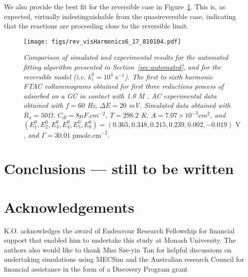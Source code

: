 \documentclass[a4paper, 12pt]{article}
\begin{document}
We also provide the best fit for the reversible case in
Figure~\ref{fig:rev_best_result}. This is, as expected, virtually
indestinguishable from the quasireversible case, indicating that the reactions
are proceeding close to the reversible limit.

\begin{figure}[htbp]
\texttt{[image: figs/rev\_visHarmonics6\_17\_810104.pdf]}
    \caption{\it{Comparison of simulated and experimental results for the
    automated fitting algorithm presented in Section~\ref{sec:automated}, and
    for the reversible model (i.e. $k^0_i = 10^{4}\text{ s}^{-1}$). The first to
    sixth harmonic FTAC voltammograms obtained for first three reductions
    process of  adsorbed on a GC in contact with 1.0 M
    . AC experimental data obtained with $f = 60$ Hz, $\Delta E = 20$
    mV. Simulated data obtained with $R_u = 50 \Omega$, $C_{dl} = 8 \mu
    F.cm^{-2}$, $T = 298.2$ K, $A = 7.07 \times 10^{-3} cm^2$, and
    $(E^0_1,E^0_2,E^0_3,E^0_4,E^0_5,E^0_6) = (0.365, 0.348, 0.215, 0.239, 0.002,
    -0.019)\text{ V}$, and $\Gamma = 30.01\text{ pmole.cm}^{-2}$.}}
    \label{fig:rev_best_result}
\end{figure}




\section{Conclusions --- still to be written}

\section{Acknowledgements}

K.O. acknowledges the award of Endeavour Research Fellowship for financial
support that enabled him to undertake this study at Monash University. The
authors also would like to thank Miss Sze-yin Tan for helpful discussions on
undertaking simulations using MECSim and the Australian research Council for
financial assistance in the form of a Discovery Program grant



\end{document}

